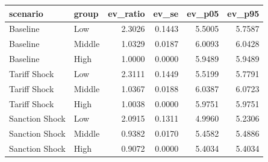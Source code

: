 \begin{tabular}{llrrrr}
\toprule
scenario & group & ev_ratio & ev_se & ev_p05 & ev_p95 \\
\midrule
Baseline & Low & 2.3026 & 0.1443 & 5.5005 & 5.7587 \\
Baseline & Middle & 1.0329 & 0.0187 & 6.0093 & 6.0428 \\
Baseline & High & 1.0000 & 0.0000 & 5.9489 & 5.9489 \\
Tariff Shock & Low & 2.3111 & 0.1449 & 5.5199 & 5.7791 \\
Tariff Shock & Middle & 1.0367 & 0.0188 & 6.0387 & 6.0723 \\
Tariff Shock & High & 1.0038 & 0.0000 & 5.9751 & 5.9751 \\
Sanction Shock & Low & 2.0915 & 0.1311 & 4.9960 & 5.2306 \\
Sanction Shock & Middle & 0.9382 & 0.0170 & 5.4582 & 5.4886 \\
Sanction Shock & High & 0.9072 & 0.0000 & 5.4034 & 5.4034 \\
\bottomrule
\end{tabular}
